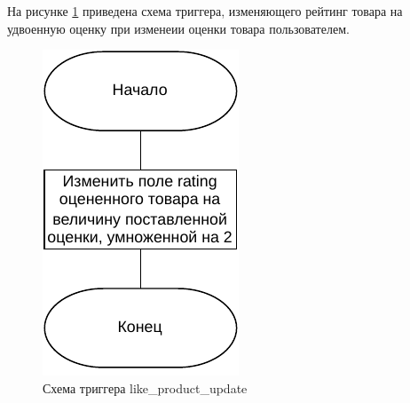 На рисунке \ref{like_update_product_trigger} приведена схема триггера, изменяющего рейтинг товара на удвоенную оценку при изменеии оценки товара пользователем. 

\captionsetup{singlelinecheck = false, justification=centering}
\begin{figure}[h!]
	\begin{center}
		\includegraphics[scale=0.8]{assets/like_update_product_trigger.pdf}
	\end{center}
	\caption{Схема триггера like\_product\_update}
	\label{like_update_product_trigger}
\end{figure}
